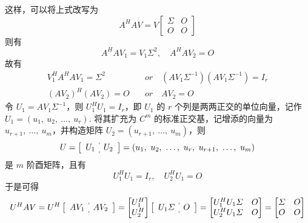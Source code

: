             这样，可以将上式改写为
            \begin{equation*}
                A^HAV = V \begin{bmatrix}
                    \varSigma & O \\ O & O
                \end{bmatrix}
            \end{equation*}
            则有
            \begin{equation*}
                A^HAV_1 = V_1\varSigma^2, \quad A^HAV_2 = O 
            \end{equation*}
            故有
            \begin{align*}
                V_1^HA^HAV_1 = \varSigma^2 \quad &or \quad (AV_1\varSigma^{-1})(AV_1\varSigma^{-1}) = I_r \\
                (AV_2)^H(AV_2) = O \quad &or \quad AV_2 = O
            \end{align*}
            令 $U_1 = AV_1\varSigma^{-1}$，则 $U_1^HU_1 = I_r$，即 $U_1$ 的 $r$ 个列是两两正交的单位向量，记作 $U_1 = (u_1, \ u_2, \ \dots, \ u_r)$. 将其扩充为 $C^m$ 的标准正交基，记增添的向量为 $u_{r+1}, \ \dots, \ u_m$，并构造矩阵 $U_2 = (u_{r+1}, \ \dots, \ u_m)$，则
            \begin{equation*}
                U = \left[\begin{array}{c:c} U_1 & U_2 \end{array}\right] = (u_1, \ u_2, \ \dots, \ u_r, \ u_{r+1}, \ \dots, \ u_m)
            \end{equation*}
            是 $m$ 阶酉矩阵，且有
            \begin{equation*}
                U_1^HU_1 = I_r, \quad U_2^HU_1 = O
            \end{equation*}
            于是可得
            \begin{equation*}
                U^HAV = U^H \left[\begin{array}{c:c}
                     AV_1 & AV_2 \end{array}\right] = \begin{bmatrix}
                    U_1^H \\ U_2^H
                \end{bmatrix}\left[\begin{array}{c:c}
                    U_1\varSigma & O
                \end{array}\right] = \begin{bmatrix}
                    U_1^HU_1\varSigma & O \\ U_2^HU_1\varSigma & O
                \end{bmatrix} = \begin{bmatrix}
                    \varSigma & O \\ O & O
                \end{bmatrix}
            \end{equation*}
